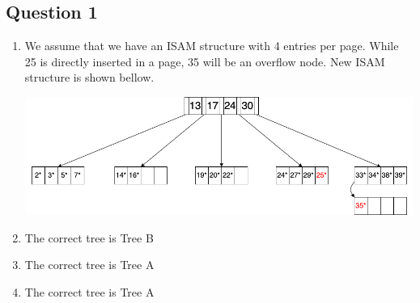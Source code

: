 \newpage
\subsection*{Question 1}

\begin{enumerate}[label={(\alph*)}]
    \item We assume that we have an ISAM structure with 4 entries per page. While 25 is directly inserted in a page, 35 will be an overflow node. New ISAM structure is shown bellow. 
    
        \begin{center}
        \includegraphics[width=1\textwidth]{img/img1.png}
        \end{center}
        
    \item The correct tree is Tree B
    
    \item The correct tree is Tree A
    
    \item The correct tree is Tree A
\end{enumerate}
